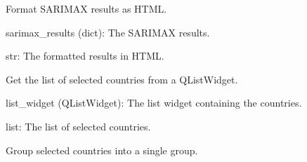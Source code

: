 \documentclass[letterpaper,10pt,english]{sphinxmanual}
\begin{document}
\begin{fulllineitems}
\begin{fulllineitems}
\label{\detokenize{Mainwindow:Mainwindow.MainWindow.format_sarimax_results}}
\pysigstartsignatures
{}
\pysigstopsignatures
\sphinxAtStartPar
Format SARIMAX results as HTML.
\begin{description}
\sphinxAtStartPar
sarimax\_results (dict): The SARIMAX results.

\sphinxAtStartPar
str: The formatted results in HTML.

\end{description}

\end{fulllineitems}


\begin{fulllineitems}
\label{\detokenize{Mainwindow:Mainwindow.MainWindow.get_selected_countries}}
\pysigstartsignatures
{}
\pysigstopsignatures
\sphinxAtStartPar
Get the list of selected countries from a QListWidget.
\begin{description}
\sphinxAtStartPar
list\_widget (QListWidget): The list widget containing the countries.

\sphinxAtStartPar
list: The list of selected countries.

\end{description}

\end{fulllineitems}


\begin{fulllineitems}
\label{\detokenize{Mainwindow:Mainwindow.MainWindow.group_countries}}
\pysigstartsignatures
{}
\pysigstopsignatures
\sphinxAtStartPar
Group selected countries into a single group.

\end{fulllineitems}


\end{fulllineitems}
\end{document}

